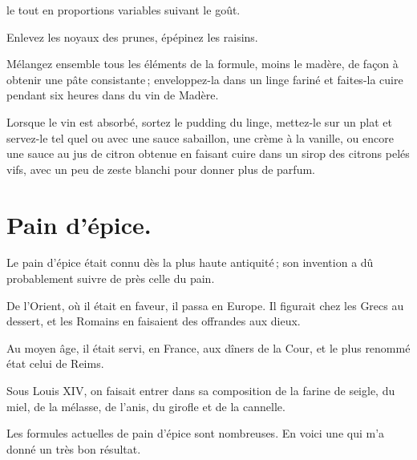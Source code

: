 le tout en proportions variables suivant le goût.

Enlevez les noyaux des prunes, épépinez les raisins.

Mélangez ensemble tous les éléments de la formule, moins le madère, de façon
à obtenir une pâte consistante ; enveloppez-la dans un linge fariné et
faites-la cuire pendant six heures dans du vin de Madère.

Lorsque le vin est absorbé, sortez le pudding du linge, mettez-le sur un plat
et servez-le tel quel ou avec une sauce sabaillon, une crème à la vanille, ou
encore une sauce au jus de citron obtenue en faisant cuire dans un sirop des
citrons pelés vifs, avec un peu de zeste blanchi pour donner plus de parfum.

\section*{\centering Pain d'épice.}
{}

Le pain d'épice était connu dès la plus haute antiquité ; son invention a dû
probablement suivre de près celle du pain.

De l'Orient, où il était en faveur, il passa en Europe. Il figurait chez les Grecs
au dessert, et les Romains en faisaient des offrandes aux dieux.

Au moyen âge, il était servi, en France, aux dîners de la Cour, et le plus renommé
état celui de Reims.

Sous Louis XIV, on faisait entrer dans sa composition de la farine de seigle,
du miel, de la mélasse, de l'anis, du girofle et de la cannelle.

Les formules actuelles de pain d'épice sont nombreuses. En voici une qui m'a
donné un très bon résultat.

